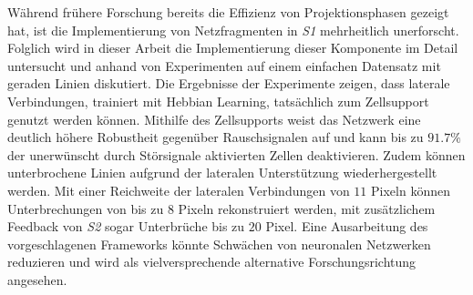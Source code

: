 Während frühere Forschung bereits die Effizienz von Projektionsphasen gezeigt hat, ist die Implementierung von Netzfragmenten in \emph{S1} mehrheitlich unerforscht.
Folglich wird in dieser Arbeit die Implementierung dieser Komponente im Detail untersucht und anhand von Experimenten auf einem einfachen Datensatz mit geraden Linien diskutiert. Die Ergebnisse der Experimente zeigen, dass laterale Verbindungen, trainiert mit Hebbian Learning, tatsächlich zum Zellsupport genutzt werden können.
Mithilfe des Zellsupports weist das Netzwerk eine deutlich höhere Robustheit gegenüber Rauschsignalen auf und kann bis zu $91.7\%$ der unerwünscht durch Störsignale aktivierten Zellen deaktivieren. Zudem können unterbrochene Linien aufgrund der lateralen Unterstützung wiederhergestellt werden. Mit einer Reichweite der lateralen Verbindungen von $11$ Pixeln können Unterbrechungen von bis zu $8$ Pixeln rekonstruiert werden, mit zusätzlichem Feedback von \emph{S2} sogar Unterbrüche bis zu $20$ Pixel. Eine Ausarbeitung des vorgeschlagenen Frameworks könnte Schwächen von neuronalen Netzwerken reduzieren und wird als vielversprechende alternative Forschungsrichtung angesehen.
